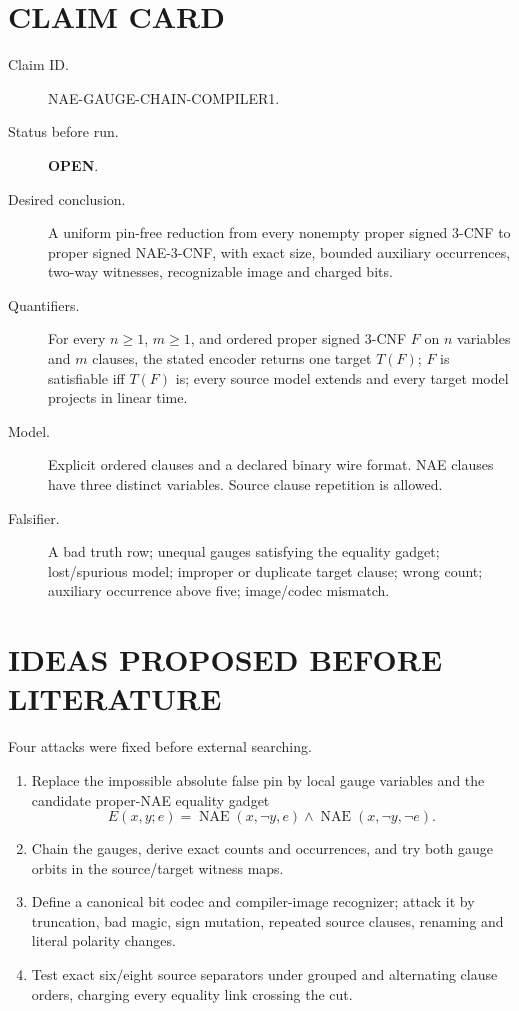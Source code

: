 \documentclass[11pt]{article}
\newcommand{\OPEN}{\textbf{OPEN}}
\begin{document}
\section{CLAIM CARD}
\begin{description}
\item[Claim ID.] NAE-GAUGE-CHAIN-COMPILER1.
\item[Status before run.] \OPEN.
\item[Desired conclusion.] A uniform pin-free reduction from every nonempty
proper signed 3-CNF to proper signed NAE-3-CNF, with exact size, bounded
auxiliary occurrences, two-way witnesses, recognizable image and charged bits.
\item[Quantifiers.] For every $n\ge1$, $m\ge1$, and ordered proper signed
3-CNF $F$ on $n$ variables and $m$ clauses, the stated encoder returns one
target $T(F)$; $F$ is satisfiable iff $T(F)$ is; every source model extends and
every target model projects in linear time.
\item[Model.] Explicit ordered clauses and a declared binary wire format.  NAE
clauses have three distinct variables.  Source clause repetition is allowed.
\item[Falsifier.] A bad truth row; unequal gauges satisfying the equality
gadget; lost/spurious model; improper or duplicate target clause; wrong count;
auxiliary occurrence above five; image/codec mismatch.
\end{description}

\section{IDEAS PROPOSED BEFORE LITERATURE}
Four attacks were fixed before external searching.
\begin{enumerate}
\item Replace the impossible absolute false pin by local gauge variables and
the candidate proper-NAE equality gadget
\[E(x,y;e)=\operatorname{NAE}(x,\neg y,e)\wedge
\operatorname{NAE}(x,\neg y,\neg e).\]
\item Chain the gauges, derive exact counts and occurrences, and try both gauge
orbits in the source/target witness maps.
\item Define a canonical bit codec and compiler-image recognizer; attack it by
truncation, bad magic, sign mutation, repeated source clauses, renaming and
literal polarity changes.
\item Test exact six/eight source separators under grouped and alternating
clause orders, charging every equality link crossing the cut.
\end{enumerate}
\end{document}
